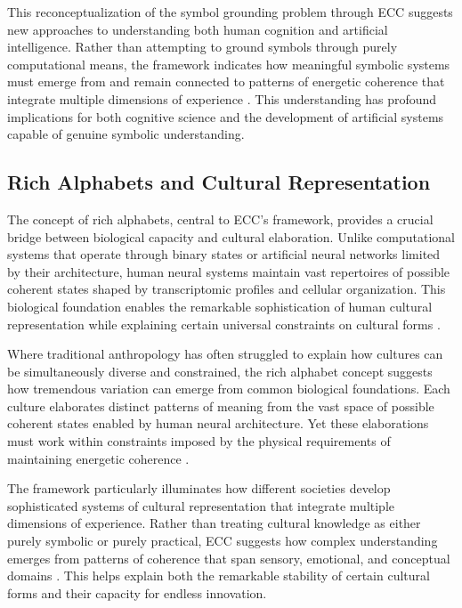 This reconceptualization of the symbol grounding problem through ECC suggests new approaches to understanding both human cognition and artificial intelligence. Rather than attempting to ground symbols through purely computational means, the framework indicates how meaningful symbolic systems must emerge from and remain connected to patterns of energetic coherence that integrate multiple dimensions of experience \cite{harnad1990symbol}. This understanding has profound implications for both cognitive science and the development of artificial systems capable of genuine symbolic understanding.

\subsection{Rich Alphabets and Cultural Representation}

The concept of rich alphabets, central to ECC's framework, provides a crucial bridge between biological capacity and cultural elaboration. Unlike computational systems that operate through binary states or artificial neural networks limited by their architecture, human neural systems maintain vast repertoires of possible coherent states shaped by transcriptomic profiles and cellular organization. This biological foundation enables the remarkable sophistication of human cultural representation while explaining certain universal constraints on cultural forms \cite{shore1996culture}.

Where traditional anthropology has often struggled to explain how cultures can be simultaneously diverse and constrained, the rich alphabet concept suggests how tremendous variation can emerge from common biological foundations. Each culture elaborates distinct patterns of meaning from the vast space of possible coherent states enabled by human neural architecture. Yet these elaborations must work within constraints imposed by the physical requirements of maintaining energetic coherence \cite{wagner1981invention}.

The framework particularly illuminates how different societies develop sophisticated systems of cultural representation that integrate multiple dimensions of experience. Rather than treating cultural knowledge as either purely symbolic or purely practical, ECC suggests how complex understanding emerges from patterns of coherence that span sensory, emotional, and conceptual domains \cite{geertz1973interpretation}. This helps explain both the remarkable stability of certain cultural forms and their capacity for endless innovation.

